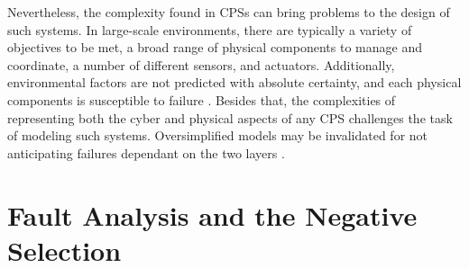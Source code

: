 
Nevertheless, the complexity found in CPSs can bring problems to the design of such systems. In large-scale environments, there are typically a variety of objectives to be met, a broad range of physical components to manage and coordinate, a number of different sensors, and actuators. Additionally, environmental factors are not predicted with absolute certainty, and each physical components is susceptible to failure \cite{jacoby2010testing}. Besides that, the complexities of representing both the cyber and physical aspects of any CPS challenges the task of modeling such systems. Oversimplified models may be invalidated for not anticipating failures dependant on the two layers \cite{2014PerceptionsSOTAV&VCPS}. 




\section{Fault Analysis and the Negative Selection}

